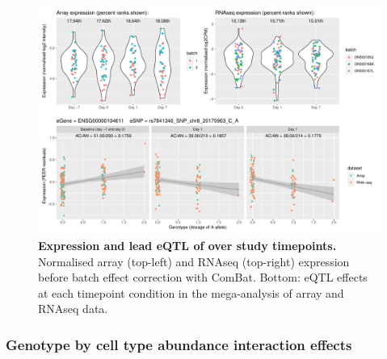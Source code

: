\begin{figure}
    \centering
    \includegraphics[width=1.0\textwidth,page=1]{mainmatter/figures/chapter_03/plot_dge_eqtl_genotypes.ENSG00000104611,rs7841346_SNP_chr8_20170963_C_A.pdf}
    \caption{
        \textbf{Expression and lead \gls{eQTL} of  over study timepoints.}
        Normalised array (top-left) and \gls{RNAseq} (top-right) expression before batch effect correction with ComBat.
        Bottom: \gls{eQTL} effects at each timepoint condition in the mega-analysis of array and \gls{RNAseq} data.
    }
    \label{fig:hird_reQTL_ploteQTL_SH2D4A}
\end{figure}

\subsubsection{Genotype by cell type abundance interaction effects}

